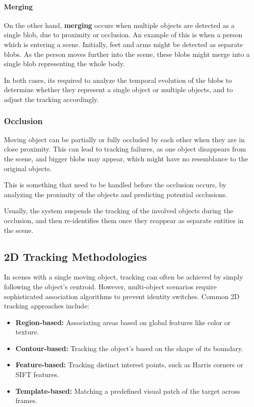 \paragraph{Merging}
On the other hand, \textbf{merging} occurs when multiple objects are detected as a single blob, due to proximity or occlusion.
An example of this is when a person which is entering a scene. Initially, feet and arms might be detected as separate blobs.
As the person moves further into the scene, these blobs might merge into a single blob representing the whole body.

In both cases, its required to analyze the temporal evolution of the blobs to determine whether they represent a single object or multiple 
objects, and to adjust the tracking accordingly.

\subsubsection{Occlusion}
Moving object can be partially or fully occluded by each other when they are in close proximity.
This can lead to tracking failures, as one object disappears from the scene, and bigger blobs may appear, which
might have no resemblance to the original objects.

This is something that need to be handled before the occlusion occurs, by analyzing the proximity 
of the objects and predicting potential occlusions. 

Usually, the system suspends the tracking of the involved objects during the occlusion, and then re-identifies
them once they reappear as separate entities in the scene.

\subsection{2D Tracking Methodologies}
In scenes with a single moving object, tracking can often be achieved by simply following the object's centroid. 
However, multi-object scenarios require sophisticated association algorithms to prevent identity switches. 
Common 2D tracking approaches include:
\begin{itemize}
    \item \textbf{Region-based:} Associating areas based on global features like color or texture.
    \item \textbf{Contour-based:} Tracking the object's based on the shape of its boundary.
    \item \textbf{Feature-based:} Tracking distinct interest points, such as Harris corners or SIFT features.
    \item \textbf{Template-based:} Matching a predefined visual patch of the target across frames.
\end{itemize}

